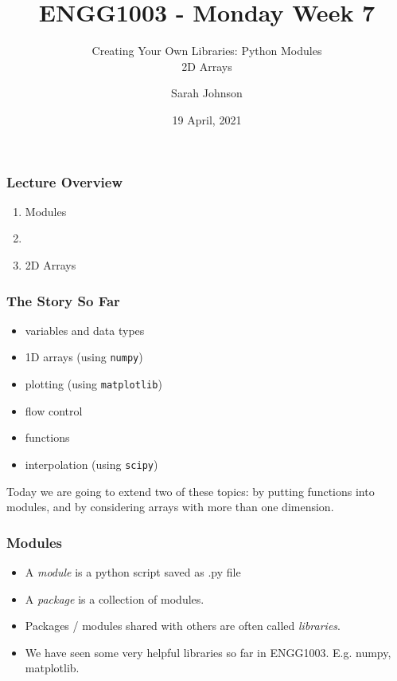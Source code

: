 \documentclass[english,14pt]{beamer}
\title{ENGG1003 - Monday Week 7}
\subtitle{Creating Your Own Libraries: Python Modules \\ 2D Arrays}
\author{Sarah Johnson}
\institute{University of Newcastle}
\date{19 April, 2021}
\begin{document}
\framebreak

\begin{frame}[fragile]

\frametitle{Lecture Overview}
\begin{enumerate}
	\item Modules
	\item[]
	
	\item 2D Arrays
	
	

\end{enumerate}

\end{frame}

\begin{frame}[fragile]
\frametitle{The Story So Far}
\vspace*{-5mm}
\begin{itemize}
	\item variables and data types
	\item 1D arrays (using \texttt{numpy})
	\item plotting (using \texttt{matplotlib})
	\item flow control
	\item functions
	\item interpolation (using \texttt{scipy})
\end{itemize}
\vspace*{3mm}
Today we are going to extend two of these topics: by putting functions into modules, and by considering arrays with more than one dimension.

\end{frame}



\begin{frame}[fragile]
\frametitle{Modules}
	\begin{itemize}
		\item A \textit{module} is a python script saved as .py file
		\item A \textit{package} is a collection of modules.
		\item Packages / modules shared with others are often called \textit{libraries}.
		\item We have seen some very helpful libraries so far in ENGG1003. E.g. numpy, matplotlib.
	\end{itemize}
\end{frame}
\end{document}
